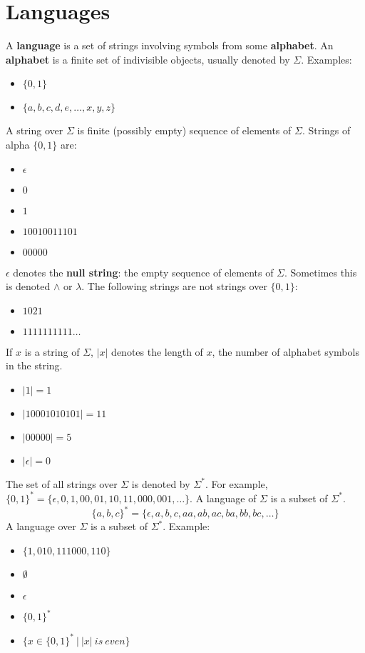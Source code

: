 \documentclass[letterpaper, 12pt]{math}
\begin{document}
\section*{Languages}
A \textbf{language} is a set of strings involving symbols from some
\textbf{alphabet}. An \textbf{alphabet} is a finite set of
indivisible objects, usually denoted by \( \Sigma \). Examples:
\begin{itemize}
  \item \( \{0,1\} \)
  \item \( \{a,b,c,d,e,\dots,x,y,z\} \)
\end{itemize}

A string over \( \Sigma \) is finite (possibly empty) sequence of elements of
\( \Sigma \). Strings of alpha \( \{0,1\} \) are:
\begin{itemize}
  \item \( \epsilon \)
  \item \( 0 \)
  \item \( 1 \)
  \item \( 10010011101 \)
  \item \( 00000 \)
\end{itemize}

\( \epsilon \) denotes the \textbf{null string}: the empty sequence of elements
of \( \Sigma \). Sometimes this is denoted \( \wedge \) or \( \lambda \). The
following strings are not strings over \( \{0,1\} \):
\begin{itemize}
  \item \( 1021 \)
  \item \( 1111111111\dots \)
\end{itemize}

If \( x \) is a string of \( \Sigma \), \( |x| \) denotes the length of \( x \),
the number of alphabet symbols in the string.
\begin{itemize}
  \item \( |1| = 1 \)
  \item \( |10001010101| = 11 \)
  \item \( |00000| = 5 \)
  \item \( |\epsilon| = 0 \)
\end{itemize}

The set of all strings over \( \Sigma \) is denoted by \( \Sigma^* \).
For example, \( \{0,1\}^* = \{\epsilon,0,1,00,01,10,11,000,001,\dots\} \).
A language of \( \Sigma \) is a subset of \( \Sigma^* \).
\[ \{a,b,c\}^* = \{\epsilon,a,b,c,aa,ab,ac,ba,bb,bc,\dots\} \]
A language over \( \Sigma \) is a subset of \( \Sigma^* \). Example:
\begin{itemize}
  \item \( \{1,010,111000,110\} \)
  \item \( \emptyset \)
  \item \( \epsilon \)
  \item \( \{0,1\}^* \)
  \item \( \{x\in\{0,1\}^*\ |\ |x|\ is\ even\} \)
\end{itemize}
\end{document}
